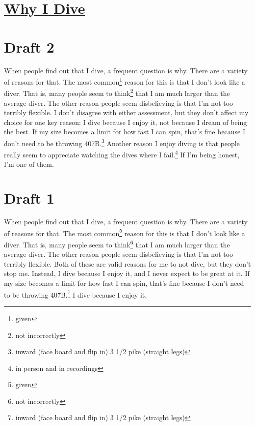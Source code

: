 \documentclass[12pt]{article}[titlepage]
\newcommand{\1}{\={a}}
\newcommand{\2}{\={e}}
\newcommand{\3}{\={\i}}
\newcommand{\4}{\=o}
\newcommand{\5}{\=u}
\newcommand{\6}{\={A}}
\renewcommand{\,}{\textsuperscript{,}}
\begin{document}
\doublespacing
\section{\href{why-i-dive.html}{Why I Dive}}
\section{Draft 2}
When people find out that I dive, a frequent question is why.
There are a variety of reasons for that.
The most common\footnote{given} reason for this is that I don't look like a diver.
That is, many people seem to think\footnote{not incorrectly} that I am much larger than the average diver.
The other reason people seem disbelieving is that I'm not too terribly flexible.
I don't disagree with either assessment, but they don't affect my choice for one key reason: I dive because I enjoy it, not because I dream of being the best.
If my size becomes a limit for how fast I can spin, that's fine because I don't need to be throwing 407B.\footnote{inward (face board and flip in) 3 1/2 pike (straight legs)}
Another reason I enjoy diving is that people really seem to appreciate watching the dives where I fail.\footnote{in person and in recordings}
If I'm being honest, I'm one of them.
\section{Draft 1}
When people find out that I dive, a frequent question is why.
There are a variety of reasons for that.
The most common\footnote{given} reason for this is that I don't look like a diver.
That is, many people seem to think\footnote{not incorrectly} that I am much larger than the average diver.
The other reason people seem disbelieving is that I'm not too terribly flexible.
Both of these are valid reasons for me to not dive, but they don't stop me.
Instead, I dive because I enjoy it, and I never expect to be great at it.
If my size becomes a limit for how fast I can spin, that's fine because I don't need to be throwing 407B.\footnote{inward (face board and flip in) 3 1/2 pike (straight legs)}
I dive because I enjoy it.
\end{document}
